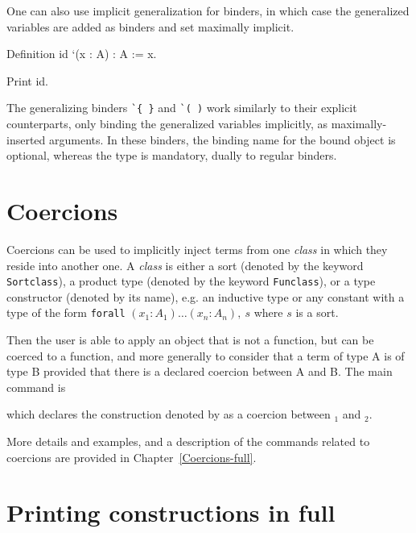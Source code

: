 One can also use implicit generalization for binders, in which case the
generalized variables are added as binders and set maximally implicit.
\begin{coq_example*}
Definition id `(x : A) : A := x.
\end{coq_example*}
\begin{coq_example}
Print id.
\end{coq_example}

The generalizing binders \texttt{\`{}\{ \}} and \texttt{\`{}( )} work similarly to
their explicit counterparts, only binding the generalized variables
implicitly, as maximally-inserted arguments. In these binders, the
binding name for the bound object is optional, whereas the type is
mandatory, dually to regular binders.

\section{Coercions
\label{Coercions}
}

Coercions can be used to implicitly inject terms from one {\em class} in
which they reside into another one. A {\em class} is either a sort
(denoted by the keyword {\tt Sortclass}), a product type (denoted by the
keyword {\tt Funclass}), or a type constructor (denoted by its name),
e.g. an inductive type or any constant with a type of the form
\texttt{forall} $(x_1:A_1) \ldots (x_n:A_n),~s$ where $s$ is a sort.

Then the user is able to apply an
object that is not a function, but can be coerced to a function, and
more generally to consider that a term of type A is of type B provided
that there is a declared coercion between A and B. The main command is
\begin{quote}
{}
\end{quote}
which declares the construction denoted by {\qualid} as a
coercion between {\class$_1$} and {\class$_2$}.

More details and examples, and a description of the commands related
to coercions are provided in Chapter~\ref{Coercions-full}.

\section[Printing constructions in full]{Printing constructions in full\label{SetPrintingAll}
}

